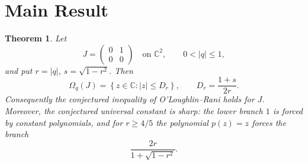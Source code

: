 \documentclass[11pt]{article}
\newtheorem{theorem}{Theorem}
\begin{document}
\section*{Main Result}

\begin{theorem}
Let
\[
J=\begin{pmatrix}0&1\\0&0\end{pmatrix}
\quad\text{on }\mathbb C^2,
\qquad 0<|q|\le1,
\]
and put \(r=|q|\), \(s=\sqrt{1-r^2}\).  Then
\[
\Omega_q(J)=\left\{z\in\mathbb C: |z|\le D_r\right\},
\qquad
D_r=\frac{1+s}{2r}.
\]
Consequently the conjectured inequality of O'Loughlin--Rani holds for \(J\).
Moreover, the conjectured universal constant is sharp: the lower branch \(1\)
is forced by constant polynomials, and for \(r\ge4/5\) the polynomial \(p(z)=z\)
forces the branch
\[
\frac{2r}{1+\sqrt{1-r^2}}.
\]
\end{theorem}
\end{document}
